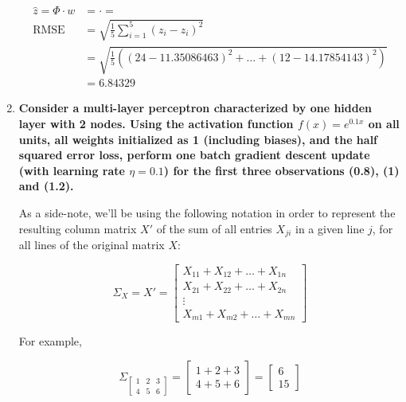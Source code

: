 \documentclass[12pt]{article}
\begin{document}
\begin{enumerate}[leftmargin=\labelsep]
        \begin{equation*}
          \begin{aligned}
            \hat{z} = \Phi \cdot w & =  \cdot 
            =                                                                                  \\
            \text{RMSE}            & = \sqrt{\frac{1}{5} \sum_{i=1}^5 (z_i - \hat{z}_i)^2}                                    \\
                                   & = \sqrt{\frac{1}{5} \left( (24 - 11.35086463)^2 + \hdots + (12 - 14.17854143)^2 \right)} \\
                                   & = 6.84329
          \end{aligned}
        \end{equation*}

        \pagebreak

  \item \textbf{Consider a multi-layer perceptron characterized by one hidden layer with 2 nodes.
          Using the activation function $f(x) = e^{0.1x}$ on all units, all weights
          initialized as 1 (including biases), and the half squared error loss, perform
          one batch gradient descent update (with learning rate $\eta = 0.1$)
          for the first three observations (0.8), (1) and (1.2).
        }

        As a side-note, we'll be using the following notation in order to represent the resulting column matrix $X'$
        of the sum of all entries $X_{ji}$ in a given line $j$, for all lines of the original matrix $X$:

        $$
          \Sigma_X = X' = \begin{bmatrix}
            X_{11} + X_{12} + \hdots + X_{1n} \\
            X_{21} + X_{22} + \hdots + X_{2n} \\
            \vdots                            \\
            X_{m1} + X_{m2} + \hdots + X_{mn}
          \end{bmatrix}
        $$

        For example,

        $$
          \Sigma_{\begin{bmatrix}
              1 & 2 & 3 \\
              4 & 5 & 6
            \end{bmatrix}} = \begin{bmatrix}
            1 + 2 + 3 \\
            4 + 5 + 6
          \end{bmatrix} = \begin{bmatrix}
            6 \\
            15
          \end{bmatrix}
        $$


\end{enumerate}
\end{document}
